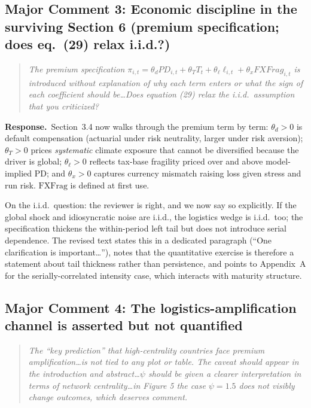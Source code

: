 \documentclass[11pt]{article}
\newcounter{comment}
\newenvironment{revcomment}%
{\refstepcounter{comment}\par\medskip\noindent\begin{quote}\itshape\color{black!70}}%
{\end{quote}\medskip}
\newcommand{\response}{\par\noindent\textbf{Response.}\ }
\begin{document}
\subsection*{Major Comment 3: Economic discipline in the surviving Section 6 (premium specification; does eq.\ (29) relax i.i.d.?)}

\begin{revcomment}
The premium specification $\pi_{i,t} = \theta_d PD_{i,t} + \theta_T T_t + \theta_\ell \ell_{i,t} + \theta_x FXFrag_{i,t}$ is introduced without explanation of why each term enters or what the sign of each coefficient should be\ldots Does equation (29) relax the i.i.d.\ assumption that you criticized?
\end{revcomment}

\response Section~3.4 now walks through the premium term by term: $\theta_d>0$ is default compensation (actuarial under risk neutrality, larger under risk aversion); $\theta_T>0$ prices \emph{systematic} climate exposure that cannot be diversified because the driver is global; $\theta_\ell>0$ reflects tax-base fragility priced over and above model-implied PD; and $\theta_x>0$ captures currency mismatch raising loss given stress and run risk. $\mathrm{FXFrag}$ is defined at first use.

On the i.i.d.\ question: the reviewer is right, and we now say so explicitly. If the global shock and idiosyncratic noise are i.i.d., the logistics wedge is i.i.d.\ too; the specification thickens the within-period left tail but does not introduce serial dependence. The revised text states this in a dedicated paragraph (``One clarification is important\ldots''), notes that the quantitative exercise is therefore a statement about tail thickness rather than persistence, and points to Appendix~A for the serially-correlated intensity case, which interacts with maturity structure.

\subsection*{Major Comment 4: The logistics-amplification channel is asserted but not quantified}

\begin{revcomment}
The ``key prediction'' that high-centrality countries face premium amplification\ldots is not tied to any plot or table. The caveat should appear in the introduction and abstract\ldots $\psi$ should be given a clearer interpretation in terms of network centrality\ldots in Figure 5 the case $\psi = 1.5$ does not visibly change outcomes, which deserves comment.
\end{revcomment}
\end{document}
